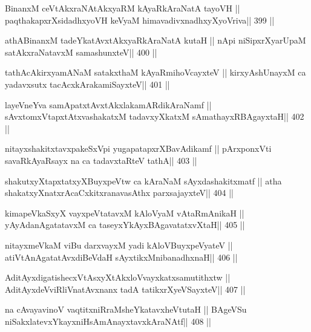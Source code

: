 \begin{shl}
BinanxM ceVtAkxraNAtAkxyaRM kAyaRkAraNatA tayoVH ||
paqthakapxrXsidadhxyoVH keVyaM himavadivxnadhxyXyoVriva|| 399 ||
\end{shl}

\begin{shl}
athABinanxM tadeYkatAvxtAkxyaRkAraNatA kutaH ||
nApi niSipxrXyarUpaM satAkxraNatavxM samashunxteV\hfill || 400 ||
\end{shl}

\begin{shl}
tathAcAkirxyamANaM satakxthaM kAyaRmihoVcayxteV ||
kirxyAshUnayxM ca yadavxsutx tacAcxkArakamiSayxteV\hfill || 401 ||
\end{shl}

\begin{shl}
layeVneYva samApatxtAvxtAkxlakamARdikAraNamf ||
sAvxtomxVtapxtAtxvashakatxM tadavxyXkatxM sAmathayxRBAgayxtaH\hfill || 402 ||
\end{shl}

\begin{shl}
nitayxshakitxtavxpakeSxV\s pi yugapatapxrXBavAdikamf ||
pArxponxVti savaRkAyaRsayx na ca tadavxtaRteV tathA\hfill || 403 ||
\end{shl}

\begin{shl}
shakutxyXtapxtatxyXBuyxpeVtw ca kAraNaM sAyxdashakitxmatf ||
atha shakatxyXnatxrAcaCxkitxranavasAthx parxsajayxteV\hfill || 404 ||
\end{shl}

\begin{shl}
kimapeVkaSxyX vayxpeVtatavxM kAloV\s yaM vAtaRmAnikaH ||
yAyAdanAgatatavxM ca taseyxYkAyxBAgavatatxvXtaH\hfill || 405 ||
\end{shl}

\begin{shl}
nitayxmeVkaM viBu darxvayxM yadi kAloV\s BuyxpeVyateV ||
atiVtAnAgatatAvxdiBeVdaH sAyxtikxMnibanadhxnaH\hfill || 406 ||
\end{shl}

\begin{shl}
AditAyxdigatishecxVtAsxyXtAkxloV\s vayxkatxsamutithxtw ||
AditAyxdeVviRliVnatAvxnanx tadA tatikxrXyeVSayxteV\hfill || 407 ||
\end{shl}

\begin{shl}
na cAvayavinoV vaqtitxniRraMsheYkatavxheVtutaH ||
BAgeVSu niSakxlatevxYkayxniHsAmAnayxtavxkAraNAtf\hfill || 408 ||
\end{shl}

